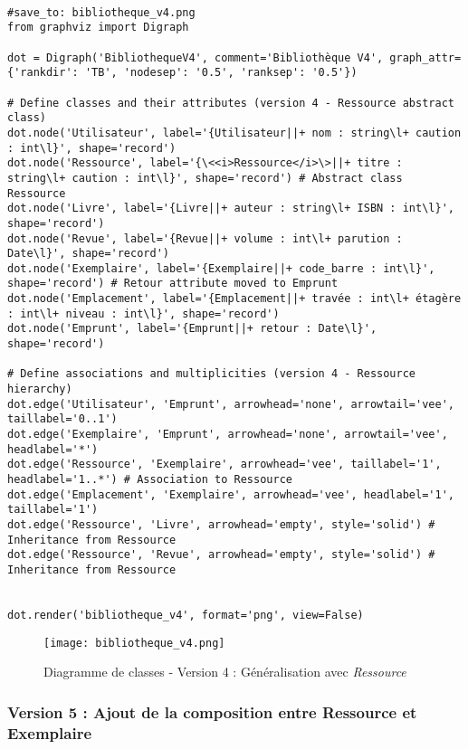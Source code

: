 \documentclass{article}
\begin{document}
\begin{verbatim}

#save_to: bibliotheque_v4.png
from graphviz import Digraph

dot = Digraph('BibliothequeV4', comment='Bibliothèque V4', graph_attr={'rankdir': 'TB', 'nodesep': '0.5', 'ranksep': '0.5'})

# Define classes and their attributes (version 4 - Ressource abstract class)
dot.node('Utilisateur', label='{Utilisateur||+ nom : string\l+ caution : int\l}', shape='record')
dot.node('Ressource', label='{\<<i>Ressource</i>\>||+ titre : string\l+ caution : int\l}', shape='record') # Abstract class Ressource
dot.node('Livre', label='{Livre||+ auteur : string\l+ ISBN : int\l}', shape='record')
dot.node('Revue', label='{Revue||+ volume : int\l+ parution : Date\l}', shape='record')
dot.node('Exemplaire', label='{Exemplaire||+ code_barre : int\l}', shape='record') # Retour attribute moved to Emprunt
dot.node('Emplacement', label='{Emplacement||+ travée : int\l+ étagère : int\l+ niveau : int\l}', shape='record')
dot.node('Emprunt', label='{Emprunt||+ retour : Date\l}', shape='record')

# Define associations and multiplicities (version 4 - Ressource hierarchy)
dot.edge('Utilisateur', 'Emprunt', arrowhead='none', arrowtail='vee', taillabel='0..1')
dot.edge('Exemplaire', 'Emprunt', arrowhead='none', arrowtail='vee', headlabel='*')
dot.edge('Ressource', 'Exemplaire', arrowhead='vee', taillabel='1', headlabel='1..*') # Association to Ressource
dot.edge('Emplacement', 'Exemplaire', arrowhead='vee', headlabel='1', taillabel='1')
dot.edge('Ressource', 'Livre', arrowhead='empty', style='solid') # Inheritance from Ressource
dot.edge('Ressource', 'Revue', arrowhead='empty', style='solid') # Inheritance from Ressource


dot.render('bibliotheque_v4', format='png', view=False)
\end{verbatim}

\begin{figure}[H]
    \centering
    \texttt{[image: bibliotheque\_v4.png]}
    \caption{Diagramme de classes - Version 4 : Généralisation avec \textit{Ressource}}
    \label{fig:bibliotheque_v4}
\end{figure}

\subsubsection{Version 5 : Ajout de la composition entre Ressource et Exemplaire}
\end{document}
